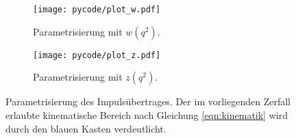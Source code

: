 
\begin{figure}
  \centering
  \begin{subfigure}{0.48\textwidth}
    \centering
    \texttt{[image: pycode/plot\_w.pdf]}
    \caption{Parametrisierung mit $w(q^2)$.}
    \label{fig:w_param}
  \end{subfigure}
  \begin{subfigure}{0.48\textwidth}
    \centering
    \texttt{[image: pycode/plot\_z.pdf]}
    \caption{Parametrisierung mit $z(q^2)$.}
    \label{fig:z_param}
  \end{subfigure}
  \caption{Parametrisierung des Impulsübertrages. Der im vorliegenden Zerfall erlaubte kinematische Bereich nach Gleichung \eqref{eqn:kinematik} wird durch den blauen Kasten verdeutlicht.}
\end{figure}
